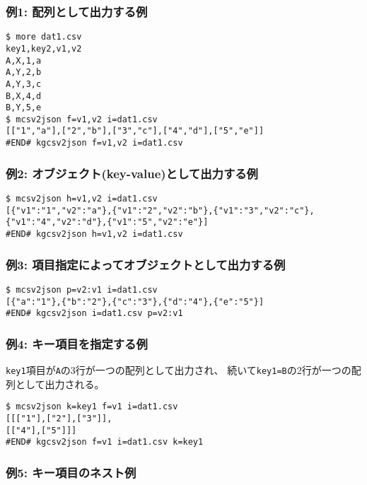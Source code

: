 \subsubsection*{例1: 配列として出力する例}



\begin{Verbatim}[baselinestretch=0.7,frame=single]
$ more dat1.csv
key1,key2,v1,v2
A,X,1,a
A,Y,2,b
A,Y,3,c
B,X,4,d
B,Y,5,e
$ mcsv2json f=v1,v2 i=dat1.csv
[["1","a"],["2","b"],["3","c"],["4","d"],["5","e"]]
#END# kgcsv2json f=v1,v2 i=dat1.csv
\end{Verbatim}
\subsubsection*{例2: オブジェクト(key-value)として出力する例}



\begin{Verbatim}[baselinestretch=0.7,frame=single]
$ mcsv2json h=v1,v2 i=dat1.csv
[{"v1":"1","v2":"a"},{"v1":"2","v2":"b"},{"v1":"3","v2":"c"},{"v1":"4","v2":"d"},{"v1":"5","v2":"e"}]
#END# kgcsv2json h=v1,v2 i=dat1.csv
\end{Verbatim}
\subsubsection*{例3: 項目指定によってオブジェクトとして出力する例}



\begin{Verbatim}[baselinestretch=0.7,frame=single]
$ mcsv2json p=v2:v1 i=dat1.csv
[{"a":"1"},{"b":"2"},{"c":"3"},{"d":"4"},{"e":"5"}]
#END# kgcsv2json i=dat1.csv p=v2:v1
\end{Verbatim}
\subsubsection*{例4: キー項目を指定する例}

\verb|key1|項目が\verb|A|の3行が一つの配列として出力され、
続いて\verb|key1=B|の2行が一つの配列として出力される。


\begin{Verbatim}[baselinestretch=0.7,frame=single]
$ mcsv2json k=key1 f=v1 i=dat1.csv
[[["1"],["2"],["3"]],
[["4"],["5"]]]
#END# kgcsv2json f=v1 i=dat1.csv k=key1
\end{Verbatim}
\subsubsection*{例5: キー項目のネスト例}

